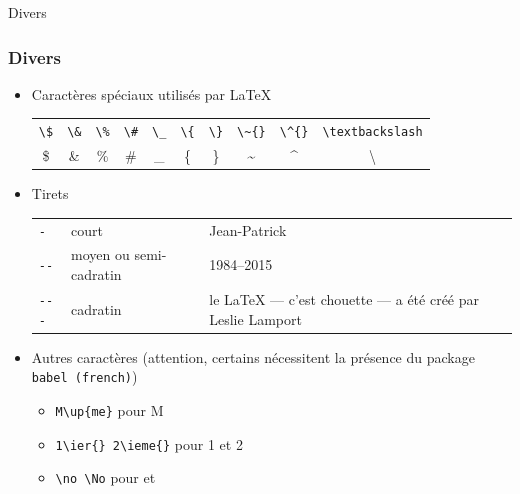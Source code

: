 \begin{frame}[fragile]{Divers}
  \frametitle{\Warning Divers}
  \begin{itemize}
  \item Caractères spéciaux utilisés par \LaTeX

  \begin{tabular}{cccccccccc}
  \lstinline|\$| & \lstinline|\&| & \lstinline|\%| & \lstinline|\#| & \lstinline|\_| & \lstinline|\{| & \lstinline|\}| & \lstinline|\~{}| & \lstinline|\^{}| & \lstinline|\textbackslash| \\
  \$ & \& & \% & \# & \_ & \{ & \} & \~{} & \^{} & \textbackslash
  \end{tabular}

  \item Tirets
   \begin{tabular}{llp{}}
     \lstinline|-| & court & Jean-Patrick\\
     \lstinline|--| & moyen ou semi-cadratin & 1984--2015\\
     \lstinline|---| & cadratin & le \LaTeX{} --- c'est chouette --- a été créé par Leslie Lamport\\
   \end{tabular}

  \item Autres caractères (attention, certains nécessitent la présence du package \texttt{babel (french)})
    \begin{itemize}
        \item \lstinline|M\up{me}| pour M
        \item \lstinline|1\ier{} 2\ieme{}| pour 1\ier{} et 2\ieme{}
        \item \lstinline|\no \No| pour \no et \No
    \end{itemize}
  \end{itemize}
\end{frame}

